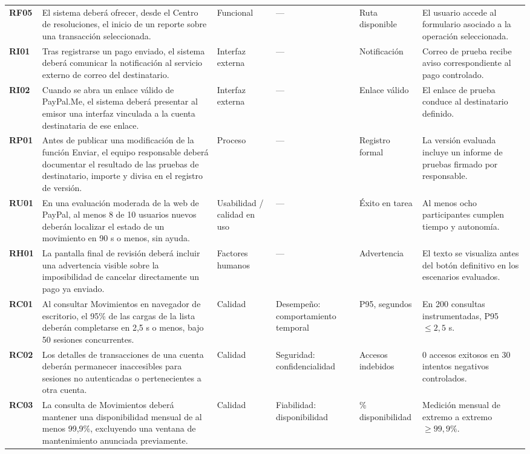 \documentclass[10pt,a4paper]{extarticle}
\newcommand{\Req}[1]{\textbf{#1}}
\begin{document}
\begin{longtable}{@{}p{1.05cm}p{5.87cm}p{1.55cm}p{2.05cm}p{1.8cm}p{3.03cm}@{}}
\Req{RF05}&El sistema deberá ofrecer, desde el Centro de resoluciones, el inicio de un reporte sobre una transacción seleccionada.&Funcional&---&Ruta disponible&El usuario accede al formulario asociado a la operación seleccionada.\\
\Req{RI01}&Tras registrarse un pago enviado, el sistema deberá comunicar la notificación al servicio externo de correo del destinatario.&Interfaz externa&---&Notificación&Correo de prueba recibe aviso correspondiente al pago controlado.\\
\Req{RI02}&Cuando se abra un enlace válido de PayPal.Me, el sistema deberá presentar al emisor una interfaz vinculada a la cuenta destinataria de ese enlace.&Interfaz externa&---&Enlace válido&El enlace de prueba conduce al destinatario definido.\\
\Req{RP01}&Antes de publicar una modificación de la función Enviar, el equipo responsable deberá documentar el resultado de las pruebas de destinatario, importe y divisa en el registro de versión.&Proceso&---&Registro formal&La versión evaluada incluye un informe de pruebas firmado por responsable.\\
\Req{RU01}&En una evaluación moderada de la web de PayPal, al menos 8 de 10 usuarios nuevos deberán localizar el estado de un movimiento en 90 s o menos, sin ayuda.&Usabilidad / calidad en uso&---&Éxito en tarea&Al menos ocho participantes cumplen tiempo y autonomía.\\
\Req{RH01}&La pantalla final de revisión deberá incluir una advertencia visible sobre la imposibilidad de cancelar directamente un pago ya enviado.&Factores humanos&---&Advertencia&El texto se visualiza antes del botón definitivo en los escenarios evaluados.\\
\Req{RC01}&Al consultar Movimientos en navegador de escritorio, el 95\% de las cargas de la lista deberán completarse en 2,5 s o menos, bajo 50 sesiones concurrentes.&Calidad&Desempeño: comportamiento temporal&P95, segundos&En 200 consultas instrumentadas, P95 $\leq 2{,}5$ s.\\
\Req{RC02}&Los detalles de transacciones de una cuenta deberán permanecer inaccesibles para sesiones no autenticadas o pertenecientes a otra cuenta.&Calidad&Seguridad: confidencialidad&Accesos indebidos&0 accesos exitosos en 30 intentos negativos controlados.\\
\Req{RC03}&La consulta de Movimientos deberá mantener una disponibilidad mensual de al menos 99,9\%, excluyendo una ventana de mantenimiento anunciada previamente.&Calidad&Fiabilidad: disponibilidad&\% disponibilidad&Medición mensual de extremo a extremo $\geq 99{,}9\%$.\\

\end{longtable}
\end{document}
